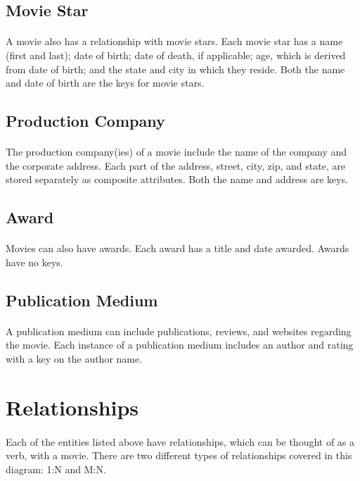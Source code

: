 \documentclass[12pt]{article}
\begin{document}
\subsection{Movie Star}
\paragraph{}A movie also has a relationship with movie stars. Each movie star has a name (first and last); date of birth; date of death, if applicable; age, which is derived from date of birth; and the state and city in which they reside. Both the name and date of birth are the keys for movie stars.
\subsection{Production Company}
\paragraph{}The production company(ies) of a movie include the name of the company and the corporate address. Each part of the address, street, city, zip, and state, are stored separately as composite attributes. Both the name and address are keys.
\subsection{Award}
\paragraph{}Movies can also have awards. Each award has a title and date awarded. Awards have no keys.
\subsection{Publication Medium}
\paragraph{} A publication medium can include publications, reviews, and websites regarding the movie. Each instance of a publication medium includes an author and rating with a key on the author name.
\section{Relationships}
\paragraph{} Each of the entities listed above have relationships, which can be thought of as a verb, with a movie. There are two different types of relationships covered in this diagram: 1:N and M:N.
\end{document}
